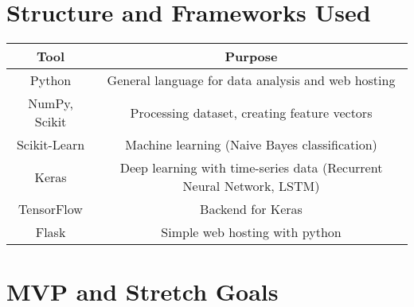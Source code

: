 \documentclass{article}
\begin{document}
\section*{Structure and Frameworks Used}
\begin{center}
 \begin{tabular}{|c | c |} 
 \hline
 Tool & Purpose \\ [0.5ex] 
 \hline\hline
 Python & General language for data analysis and web hosting\\ 
 \hline
 NumPy, Scikit & Processing dataset, creating feature vectors\\ 
 \hline
 Scikit-Learn & Machine learning (Naive Bayes classification) \\ 
 \hline
 Keras & Deep learning with time-series data (Recurrent Neural Network, LSTM) \\ 
 \hline
 TensorFlow & Backend for Keras \\ 
 \hline
 Flask & Simple web hosting with python \\ 
 \hline
\end{tabular}
\end{center}



\clearpage
\section*{MVP and Stretch Goals}




\end{document}
